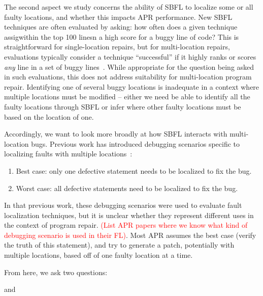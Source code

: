 \documentclass[10pt,journal,compsoc]{IEEEtran}
\newcommand\todo[1]{\textcolor{red}{#1}}
\begin{document}
The second aspect we study concerns the ability of SBFL to localize some or all faulty locations, and whether this impacts APR performance.
New SBFL techniques are often evaluated by asking: how often does a given technique assigwithin the top 100 linesn a high 
score for a buggy line of code? This is straightforward for single-location repairs, but for 
multi-location repairs, evaluations
typically consider a technique ``successful'' if it highly ranks or scores \emph{any} line in a
set of buggy lines~\cite{zou2019empirical,pearson2017evaluating,golagha2020can}.
While appropriate for the question being asked in such evaluations, this does not address
suitability for multi-location program repair. Identifying one of several buggy
locations is inadequate in a context where multiple locations must be modified -- 
either we need be able to identify all the faulty locations through SBFL
or infer where other faulty locations must be based on the location of one.

Accordingly, we want to look more broadly at how SBFL interacts with 
multi-location bugs.
Previous work has introduced debugging scenarios specific to localizing faults with multiple 
locations~\cite{pearson2017evaluating}:

\begin{enumerate}
  \item Best case: only one defective statement needs to be localized to fix the bug.
  \item Worst case: all defective statements need to be localized to fix the bug.
\end{enumerate}

In that previous work, these debugging scenarios were used to evaluate fault localization techniques, but it is unclear
whether they represent different uses in the context of program repair.
\todo{(List APR papers where we know what kind of debugging scenario is used in their FL)}.
Most APR assumes the best case (verify the truth of this statement), and try to generate a patch, 
potentially with multiple locations, based off of one faulty location at a time.

From here, we ask two questions: 


and 

\end{document}
